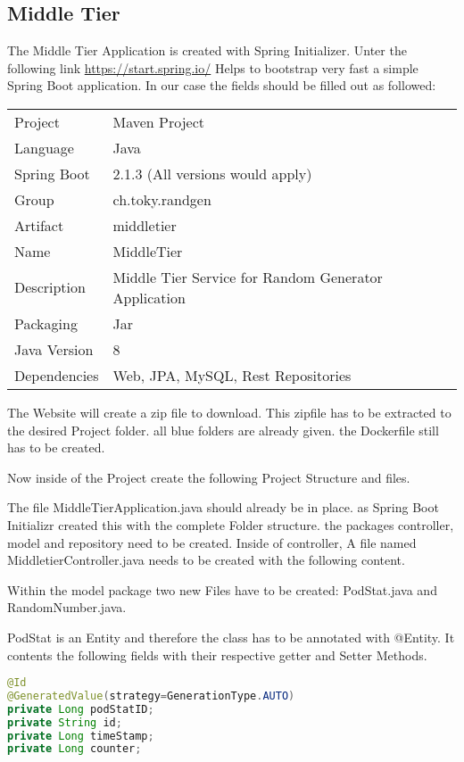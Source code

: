 \subsection{Middle Tier}
The Middle Tier Application is created with Spring Initializer.
Unter the following link \url{https://start.spring.io/} Helps to bootstrap very fast a simple Spring Boot application.
In our case the fields should be filled out as followed:
\begin{tabbing}
\begin{tabular}{ll}
Project & Maven Project \\
Language & Java \\
Spring Boot & 2.1.3 (All versions would apply) \\
Group & ch.toky.randgen \\
Artifact & middletier \\
Name & MiddleTier \\
Description & Middle Tier Service for Random Generator Application \\
Packaging & Jar \\
Java Version & 8 \\
Dependencies & Web, JPA, MySQL, Rest Repositories
\end{tabular}
\end{tabbing}
The Website will create a zip file to download. This zipfile has to be extracted to the desired Project folder.
all blue folders are already given. the Dockerfile still has to be created.

Now inside of the Project create the following Project Structure and files.

The file MiddleTierApplication.java should already be in place. as Spring Boot Initializr created this with the complete Folder structure. the packages controller, model and repository need to be created.
Inside of controller, A file named MiddletierController.java needs to be created with the following content.

Within the model package two new Files have to be created: PodStat.java and RandomNumber.java.

PodStat is an Entity and therefore the class has to be annotated with @Entity.
It contents the following fields with their respective getter and Setter Methods.
\begin{lstlisting}[language=Java]
@Id
@GeneratedValue(strategy=GenerationType.AUTO)
private Long podStatID;
private String id;
private Long timeStamp;
private Long counter;
\end{lstlisting}


